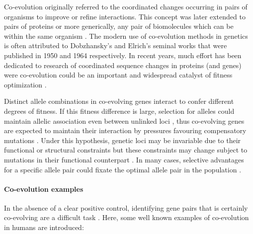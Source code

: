 Co‐evolution originally referred to the coordinated changes occurring in pairs of organisms to improve or refine interactions.
This concept was later extended to pairs of proteins or more generically, any pair of biomolecules which can be within the same organism \cite{de2013emerging}.
The modern use of co-evolution methods in genetics is often attributed to Dobzhansky's \cite{dobzhansky1950genetics} and Elrich's \cite{ehrlich1964butterflies} seminal works that were published in 1950 and 1964 respectively.
In recent years, much effort has been dedicated to research of coordinated sequence changes in proteins (and genes) were co‐evolution could be an important and widespread catalyst of fitness optimization \cite{de2013emerging}.

Distinct allele combinations in co-evolving genes interact to confer different degrees of fitness. 
If this fitness difference is large, selection for alleles could maintain allelic association even between unlinked loci \cite{rohlfs2010detecting}, thus co-evolving genes are expected to maintain their interaction by pressures favouring compensatory mutations \cite{rohlfs2010detecting}.
Under this hypothesis, genetic loci may be invariable due to their functional or structural constraints but these constraints may change subject to mutations in their functional counterpart \cite{fares2006novel}.
In many cases, selective advantages for a specific allele pair could fixate the optimal allele pair in the population \cite{rohlfs2010detecting}.

\paragraph{Co-evolution examples}
In the absence of a clear positive control, identifying gene pairs that is certainly co-evolving are a difficult task \cite{rohlfs2010detecting}.
Here, some well known examples of co-evolution in humans are introduced:

